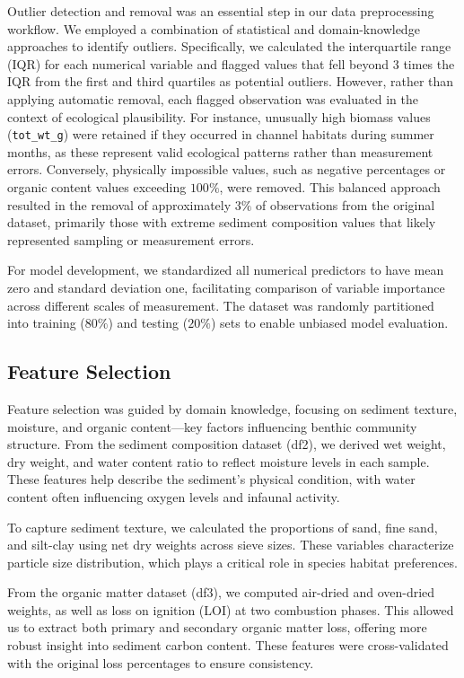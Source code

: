 \documentclass[12pt]{article}
\begin{document}
\qquad Outlier detection and removal was an essential step in our data preprocessing workflow. We employed a combination of statistical and domain-knowledge approaches to identify outliers. Specifically, we calculated the interquartile range (IQR) for each numerical variable and flagged values that fell beyond 3 times the IQR from the first and third quartiles as potential outliers. However, rather than applying automatic removal, each flagged observation was evaluated in the context of ecological plausibility. For instance, unusually high biomass values (\texttt{tot\_wt\_g}) were retained if they occurred in channel habitats during summer months, as these represent valid ecological patterns rather than measurement errors. Conversely, physically impossible values, such as negative percentages or organic content values exceeding $100\%$, were removed. This balanced approach resulted in the removal of approximately $3\%$ of observations from the original dataset, primarily those with extreme sediment composition values that likely represented sampling or measurement errors.

\qquad For model development, we standardized all numerical predictors to have mean zero and standard deviation one, facilitating comparison of variable importance across different scales of measurement. The dataset was randomly partitioned into training ($80\%$) and testing ($20\%$) sets to enable unbiased model evaluation.

\subsection{Feature Selection}

\qquad Feature selection was guided by domain knowledge, focusing on sediment texture, moisture, and organic content—key factors influencing benthic community structure. From the sediment composition dataset (df2), we derived wet weight, dry weight, and water content ratio to reflect moisture levels in each sample. These features help describe the sediment’s physical condition, with water content often influencing oxygen levels and infaunal activity.

\qquad To capture sediment texture, we calculated the proportions of sand, fine sand, and silt-clay using net dry weights across sieve sizes. These variables characterize particle size distribution, which plays a critical role in species habitat preferences.

\qquad From the organic matter dataset (df3), we computed air-dried and oven-dried weights, as well as loss on ignition (LOI) at two combustion phases. This allowed us to extract both primary and secondary organic matter loss, offering more robust insight into sediment carbon content. These features were cross-validated with the original loss percentages to ensure consistency.
\end{document}
